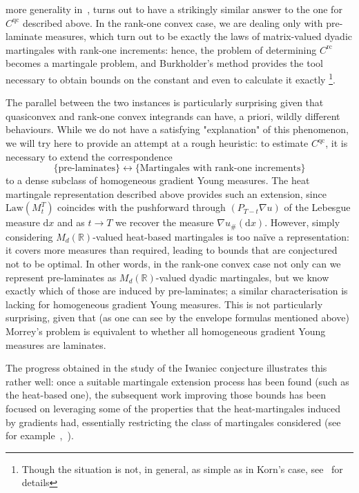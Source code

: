 \documentclass[11pt, a4paper]{amsart}
\theoremstyle{definition}
\theoremstyle{remark}
\newcommand{\R}{\mathbb{R}}
\begin{document}
more generality in~\cite{Cassese2025},
turns out to have a strikingly similar answer
to the one for
$C^{\mathrm{qc}}$ described above.
In the rank-one convex case,
we are dealing only with pre-laminate measures,
which turn out 
to be exactly the laws of
matrix-valued dyadic martingales 
with rank-one increments: hence, 
the problem of determining 
$C^{\mathrm{rc}}$ becomes a martingale problem,
and Burkholder's method provides the tool necessary to
obtain bounds on the constant
and even to calculate it exactly
\footnote{Though the situation is not, in general,
as simple as in Korn's case,
see~\cite{Cassese2025} for details}.
\par
The parallel between the
two instances is particularly surprising given that
quasiconvex and
rank-one convex integrands can have,
a priori, wildly different behaviours.
While we do not have a satisfying "explanation"
of this phenomenon,
we will try here to provide an attempt 
at a rough heuristic: 
to estimate $C^{\mathrm{qc}}$,
it is necessary to extend the correspondence 
\[\{\text{pre-laminates}\}\leftrightarrow
\{\text{Martingales with rank-one increments}\}\]
to a dense subclass of
homogeneous gradient Young measures.
The heat 
martingale representation described above provides 
such an extension,
since $\mathrm{Law}(M_t^T)$ coincides with the
pushforward through
$(P_{T-t}\nabla u)$ of the Lebesgue measure
$\mathrm{d}x$ and as $t\to T$ we 
recover the measure
$\nabla u_{\#}(\mathrm{d}x)$. However,
simply considering $M_d(\R)$-valued heat-based
martingales is too naïve a representation:
it covers more measures than required,
leading to bounds that are
conjectured not to be optimal. In other words,
in the rank-one convex case not only
can we represent pre-laminates as
$M_d(\R)$-valued dyadic martingales,
but we know exactly which of those are
induced by pre-laminates;
a similar characterisation is lacking for 
homogeneous gradient Young measures.
This is not particularly surprising, 
given that (as one can see by the envelope formulas
mentioned above) Morrey's problem 
is equivalent to whether all homogeneous gradient
Young measures are laminates.\par
The progress obtained in the study
of the Iwaniec conjecture 
illustrates this rather well:
once a suitable martingale extension 
process has been found
(such as the heat-based one),
the subsequent work improving those bounds
has been focused on leveraging some of the properties
that the heat-martingales induced by gradients had,
essentially restricting
the class of martingales considered
(see for example~\cite{Volberg},~\cite{Banuelos2008}).
\end{document}
